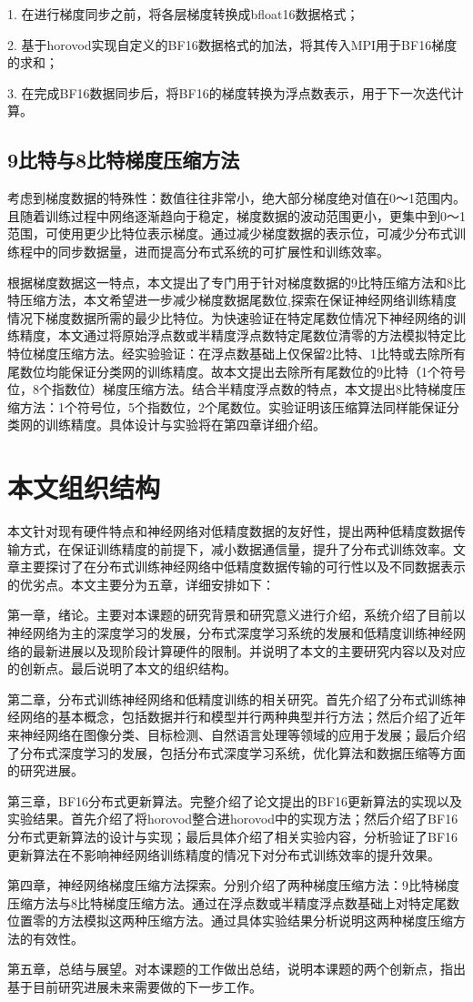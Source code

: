 1. 在进行梯度同步之前，将各层梯度转换成bfloat16数据格式；

2. 基于horovod实现自定义的BF16数据格式的加法，将其传入MPI用于BF16梯度的求和；

3. 在完成BF16数据同步后，将BF16的梯度转换为浮点数表示，用于下一次迭代计算。

\subsection{9比特与8比特梯度压缩方法}
考虑到梯度数据的特殊性：数值往往非常小，绝大部分梯度绝对值在0～1范围内。且随着训练过程中网络逐渐趋向于稳定，梯度数据的波动范围更小，更集中到0～1范围，可使用更少比特位表示梯度。通过减少梯度数据的表示位，可减少分布式训练程中的同步数据量，进而提高分布式系统的可扩展性和训练效率。

根据梯度数据这一特点，本文提出了专门用于针对梯度数据的9比特压缩方法和8比特压缩方法，本文希望进一步减少梯度数据尾数位,探索在保证神经网络训练精度情况下梯度数据所需的最少比特位。为快速验证在特定尾数位情况下神经网络的训练精度，本文通过将原始浮点数或半精度浮点数特定尾数位清零的方法模拟特定比特位梯度压缩方法。经实验验证：在浮点数基础上仅保留2比特、1比特或去除所有尾数位均能保证分类网的训练精度。故本文提出去除所有尾数位的9比特（1个符号位，8个指数位）梯度压缩方法。结合半精度浮点数的特点，本文提出8比特梯度压缩方法：1个符号位，5个指数位，2个尾数位。实验证明该压缩算法同样能保证分类网的训练精度。具体设计与实验将在第四章详细介绍。

\section{本文组织结构}
本文针对现有硬件特点和神经网络对低精度数据的友好性，提出两种低精度数据传输方式，在保证训练精度的前提下，减小数据通信量，提升了分布式训练效率。文章主要探讨了在分布式训练神经网络中低精度数据传输的可行性以及不同数据表示的优劣点。本文主要分为五章，详细安排如下：

第一章，绪论。主要对本课题的研究背景和研究意义进行介绍，系统介绍了目前以神经网络为主的深度学习的发展，分布式深度学习系统的发展和低精度训练神经网络的最新进展以及现阶段计算硬件的限制。并说明了本文的主要研究内容以及对应的创新点。最后说明了本文的组织结构。

第二章，分布式训练神经网络和低精度训练的相关研究。首先介绍了分布式训练神经网络的基本概念，包括数据并行和模型并行两种典型并行方法；然后介绍了近年来神经网络在图像分类、目标检测、自然语言处理等领域的应用于发展；最后介绍了分布式深度学习的发展，包括分布式深度学习系统，优化算法和数据压缩等方面的研究进展。

第三章，BF16分布式更新算法。完整介绍了论文提出的BF16更新算法的实现以及实验结果。首先介绍了将horovod整合进horovod中的实现方法；然后介绍了BF16分布式更新算法的设计与实现；最后具体介绍了相关实验内容，分析验证了BF16更新算法在不影响神经网络训练精度的情况下对分布式训练效率的提升效果。

第四章，神经网络梯度压缩方法探索。分别介绍了两种梯度压缩方法：9比特梯度压缩方法与8比特梯度压缩方法。通过在浮点数或半精度浮点数基础上对特定尾数位置零的方法模拟这两种压缩方法。通过具体实验结果分析说明这两种梯度压缩方法的有效性。

第五章，总结与展望。对本课题的工作做出总结，说明本课题的两个创新点，指出基于目前研究进展未来需要做的下一步工作。
